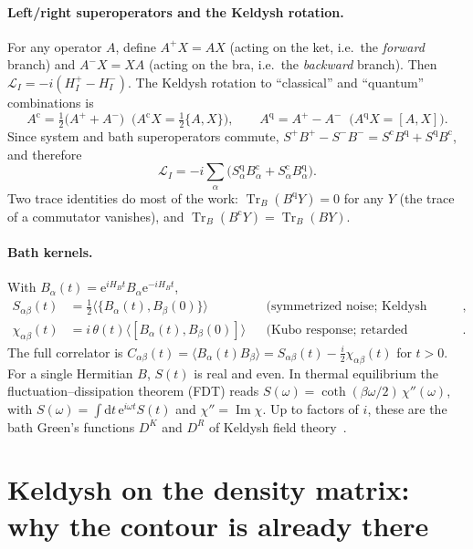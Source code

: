 \documentclass[11pt]{article}
\newcommand{\Tr}{\operatorname{Tr}}
\newcommand{\Lc}{\mathcal{L}}
\newcommand{\ee}{\mathrm{e}}
\newcommand{\dd}{\mathrm{d}}
\newcommand{\cl}{\mathrm{c}}
\newcommand{\qu}{\mathrm{q}}
\newcommand{\avg}[1]{\langle#1\rangle}
\begin{document}
\paragraph{Left/right superoperators and the Keldysh rotation.}
For any operator $A$, define $A^{+}X=AX$ (acting on the ket, i.e.\ the \emph{forward}
branch) and $A^{-}X=XA$ (acting on the bra, i.e.\ the \emph{backward} branch). Then
$\Lc_I=-i(H_I^{+}-H_I^{-})$. The Keldysh rotation to ``classical'' and ``quantum''
combinations is
\begin{equation}
  A^{\cl}=\tfrac12\big(A^{+}+A^{-}\big)\;\;\big(A^{\cl}X=\tfrac12\{A,X\}\big),\qquad
  A^{\qu}=A^{+}-A^{-}\;\;\big(A^{\qu}X=[A,X]\big).
  \label{eq:rotation}
\end{equation}
Since system and bath superoperators commute,
$S^+B^+-S^-B^-=S^{\cl}B^{\qu}+S^{\qu}B^{\cl}$, and therefore
\begin{equation}
  \boxed{\;\Lc_I=-i\sum_\alpha\big(S^{\qu}_\alpha B^{\cl}_\alpha+S^{\cl}_\alpha B^{\qu}_\alpha\big).\;}
  \label{eq:LIcq}
\end{equation}
Two trace identities do most of the work: $\Tr_B(B^{\qu}Y)=0$ for any $Y$ (the trace of a
commutator vanishes), and $\Tr_B(B^{\cl}Y)=\Tr_B(BY)$.

\paragraph{Bath kernels.}
With $B_\alpha(t)=\ee^{iH_Bt}B_\alpha\ee^{-iH_Bt}$,
\begin{align}
  S_{\alpha\beta}(t)&=\tfrac12\avg{\{B_\alpha(t),B_\beta(0)\}}
  &&\text{(symmetrized noise; Keldysh component)},\\
  \chi_{\alpha\beta}(t)&=i\,\theta(t)\avg{[B_\alpha(t),B_\beta(0)]}
  &&\text{(Kubo response; retarded component)}.
\end{align}
The full correlator is $C_{\alpha\beta}(t)=\avg{B_\alpha(t)B_\beta}=S_{\alpha\beta}(t)-\tfrac{i}{2}\chi_{\alpha\beta}(t)$
for $t>0$. For a single Hermitian $B$, $S(t)$ is real and even. In thermal equilibrium the
fluctuation--dissipation theorem (FDT) reads $S(\omega)=\coth(\beta\omega/2)\,\chi''(\omega)$, with
$S(\omega)=\int\!\dd t\,\ee^{i\omega t}S(t)$ and $\chi''=\operatorname{Im}\chi$. Up to factors of $i$, these are the bath
Green's functions $D^K$ and $D^R$ of Keldysh field theory~\cite{Kamenev2011,KamenevLevchenko2009}.

\section{Keldysh on the density matrix: why the contour is already there}
\label{sec:keldysh-rho}
\end{document}
